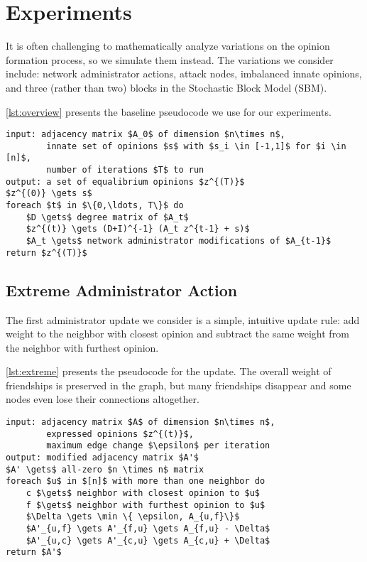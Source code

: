 
\section{Experiments}\label{sec:experiments}

It is often challenging to mathematically analyze
variations on the opinion formation process, so we simulate
them instead.
The variations we consider include:
network administrator actions, attack nodes,
imbalanced innate opinions, and three (rather than two)
blocks in the Stochastic Block Model (SBM).

\cref{lst:overview} presents the baseline
pseudocode we use for our experiments.

\begin{minipage}{\linewidth}
\begin{lstlisting}[caption={Opinion formation.}, label={lst:overview}]
input: adjacency matrix $A_0$ of dimension $n\times n$,
        innate set of opinions $s$ with $s_i \in [-1,1]$ for $i \in [n]$,
        number of iterations $T$ to run
output: a set of equalibrium opinions $z^{(T)}$
$z^{(0)} \gets s$
foreach $t$ in $\{0,\ldots, T\}$ do
    $D \gets$ degree matrix of $A_t$
    $z^{(t)} \gets (D+I)^{-1} (A_t z^{t-1} + s)$
    $A_t \gets$ network administrator modifications of $A_{t-1}$
return $z^{(T)}$
\end{lstlisting}
\end{minipage}

\subsection{Extreme Administrator Action}
The first administrator update we consider is
a simple, intuitive update rule: add weight to the neighbor
with closest opinion and subtract the same weight
from the neighbor with furthest opinion.

\cref{lst:extreme} presents the pseudocode for the update.
The overall weight of friendships is preserved in the
graph, but many friendships disappear and some nodes even
lose their connections altogether.

\begin{minipage}{\linewidth}
\begin{lstlisting}[caption={Extreme Administrator Update.}, label={lst:extreme}]
input: adjacency matrix $A$ of dimension $n\times n$,
        expressed opinions $z^{(t)}$,
        maximum edge change $\epsilon$ per iteration
output: modified adjacency matrix $A'$
$A' \gets$ all-zero $n \times n$ matrix
foreach $u$ in $[n]$ with more than one neighbor do
    c $\gets$ neighbor with closest opinion to $u$
    f $\gets$ neighbor with furthest opinion to $u$
    $\Delta \gets \min \{ \epsilon, A_{u,f}\}$
    $A'_{u,f} \gets A'_{f,u} \gets A_{f,u} - \Delta$
    $A'_{u,c} \gets A'_{c,u} \gets A_{c,u} + \Delta$
return $A'$
\end{lstlisting}
\end{minipage}

